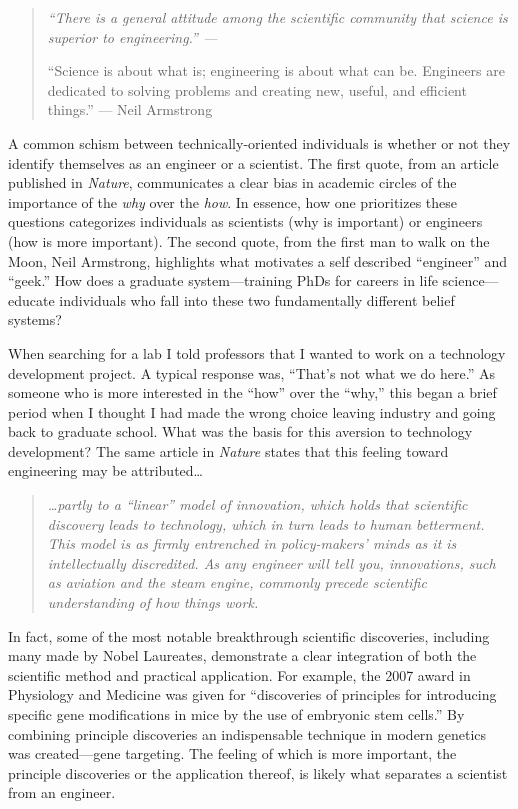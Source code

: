     \begin{quote}
      \itshape 
      \singlespacing
      ``There is a general attitude among the scientific community that science is superior to engineering.'' --- \citep{Macilwain2010}

      ``Science is about what is; engineering is about what can be. Engineers are dedicated to solving problems and creating new, useful, and efficient things.'' --- Neil Armstrong
      \end{quote}

    A common schism between technically-oriented individuals is whether or not they identify themselves as an engineer or a scientist. The first quote, from an article published in \textit{Nature}, communicates a clear bias in academic circles of the importance of the \textit{why} over the \textit{how}. In essence, how one prioritizes these questions categorizes individuals as scientists (why is important) or engineers (how is more important). The second quote, from the first man to walk on the Moon, Neil Armstrong, highlights what motivates a self described ``engineer'' and ``geek.'' How does a graduate system---training PhDs for careers in life science---educate individuals who fall into these two fundamentally different belief systems?

    When searching for a lab I told professors that I wanted to work on a technology development project. A typical response was, ``That's not what we do here.'' As someone who is more interested in the ``how'' over the ``why,'' this began a brief period when I thought I had made the wrong choice leaving industry and going back to graduate school. What was the basis for this aversion to technology development? The same article in \textit{Nature} states that this feeling toward engineering may be attributed\ldots

    \begin{quote} 
      \itshape 
      \singlespacing
      \ldots partly to a ``linear'' model of innovation, which holds that scientific discovery leads to technology, which in turn leads to human betterment. This model is as firmly entrenched in policy-makers' minds as it is intellectually discredited. As any engineer will tell you, innovations, such as aviation and the steam engine, commonly precede scientific understanding of how things work.
      \end{quote} 

    In fact, some of the most notable breakthrough scientific discoveries, including many made by Nobel Laureates, demonstrate a clear integration of both the scientific method and practical application. For example, the 2007 award in Physiology and Medicine was given for ``discoveries of principles for introducing specific gene modifications in mice by the use of embryonic stem cells.'' By combining principle discoveries an indispensable technique in modern genetics was created---gene targeting. The feeling of which is more important, the principle discoveries or the application thereof, is likely what separates a scientist from an engineer.

